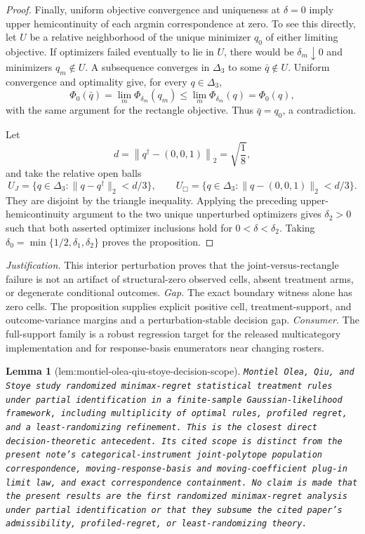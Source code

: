 \documentclass{article}
\newtheorem{lemma}{Lemma}
\begin{document}
\begin{proof}
Finally, uniform objective convergence and uniqueness at \(\delta=0\) imply upper hemicontinuity of each argmin correspondence at zero.  To see this directly, let \(U\) be a relative neighborhood of the unique minimizer \(q_0\) of either limiting objective.  If optimizers failed eventually to lie in \(U\), there would be \(\delta_m\downarrow0\) and minimizers \(q_m\notin U\).  A subsequence converges in \(\Delta_3\) to some \(\bar q\notin U\).  Uniform convergence and optimality give, for every \(q\in\Delta_3\),
\[
 \Phi_0(\bar q)
 =\lim_m\Phi_{\delta_m}(q_m)
 \leq\lim_m\Phi_{\delta_m}(q)
 =\Phi_0(q),
\]
with the same argument for the rectangle objective.  Thus \(\bar q=q_0\), a contradiction.

Let
\[
 d=\left\|q^\dagger-(0,0,1)\right\|_2=\sqrt{\frac18},
\]
and take the relative open balls
\[
 U_J=\{q\in\Delta_3:\|q-q^\dagger\|_2<d/3\},
 \qquad
 U_{\Box}=\{q\in\Delta_3:\|q-(0,0,1)\|_2<d/3\}.
\]
They are disjoint by the triangle inequality.  Applying the preceding upper-hemicontinuity argument to the two unique unperturbed optimizers gives \(\delta_2>0\) such that both asserted optimizer inclusions hold for \(0<\delta<\delta_2\).  Taking \(\delta_0=\min\{1/2,\delta_1,\delta_2\}\) proves the proposition.
\end{proof}
\par\smallskip\noindent \textit{Justification.} This interior perturbation proves that the joint-versus-rectangle failure is not an artifact of structural-zero observed cells, absent treatment arms, or degenerate conditional outcomes. \textit{Gap.} The exact boundary witness alone has zero cells.  The proposition supplies explicit positive cell, treatment-support, and outcome-variance margins and a perturbation-stable decision gap. \textit{Consumer.} The full-support family is a robust regression target for the released multicategory implementation and for response-basis enumerators near changing rosters.

\begin{lemma}[lem:montiel-olea-qiu-stoye-decision-scope]\label{lem:montiel-olea-qiu-stoye-decision-scope}
\texttt{Montiel Olea,\allowbreak{} Qiu,\allowbreak{} and Stoye study randomized minimax-\allowbreak{}regret statistical treatment rules under partial identification in a finite-\allowbreak{}sample Gaussian-\allowbreak{}likelihood framework,\allowbreak{} including multiplicity of optimal rules,\allowbreak{} profiled regret,\allowbreak{} and a least-\allowbreak{}randomizing refinement.  This is the closest direct decision-\allowbreak{}theoretic antecedent.  Its cited scope is distinct from the present note's categorical-\allowbreak{}instrument joint-\allowbreak{}polytope population correspondence,\allowbreak{} moving-\allowbreak{}response-\allowbreak{}basis and moving-\allowbreak{}coefficient plug-\allowbreak{}in limit law,\allowbreak{} and exact correspondence containment.  No claim is made that the present results are the first randomized minimax-\allowbreak{}regret analysis under partial identification or that they subsume the cited paper's admissibility,\allowbreak{} profiled-\allowbreak{}regret,\allowbreak{} or least-\allowbreak{}randomizing theory.}
\end{lemma}
\end{document}
